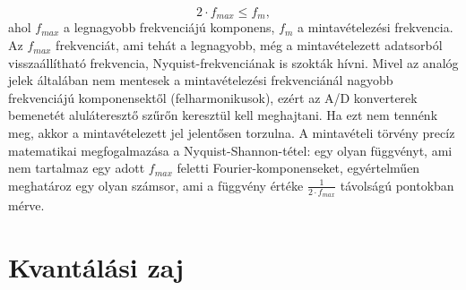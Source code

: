 \documentclass[12pt]{article}
\theoremstyle{plain}
\begin{document}
\begin{equation}
	2 \cdot f_{max} \leq f_m,
\end{equation}
ahol $f_{max}$ a legnagyobb frekvenciájú komponens, $f_m$ a mintavételezési frekvencia. Az $f_{max}$ frekvenciát, ami tehát a legnagyobb, még a mintavételezett adatsorból visszaállítható frekvencia, Nyquist-frekvenciának is szokták hívni.
Mivel az analóg jelek általában nem mentesek a mintavételezési frekvenciánál nagyobb frekvenciájú komponensektől (felharmonikusok), ezért az A/D konverterek bemenetét aluláteresztő szűrőn keresztül kell meghajtani. Ha ezt nem tennénk meg, akkor a mintavételezett jel jelentősen torzulna. A mintavételi törvény precíz matematikai megfogalmazása a Nyquist-Shannon-tétel: egy olyan függvényt, ami nem tartalmaz
egy adott $f_{max}$ feletti Fourier-komponenseket, egyértelműen meghatároz egy
olyan számsor, ami a függvény értéke $\frac{1}{2 \cdot f_{max}}$ távolságú pontokban mérve.



\section{Kvantálási zaj \cite{BME}}
\end{document}

